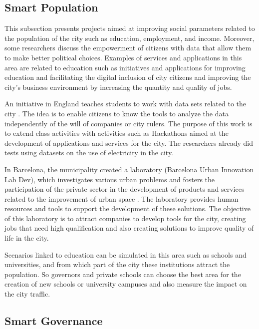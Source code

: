 \subsection{Smart Population}

This subsection presents projects aimed at improving social parameters related to the population of the city such as education, employment, and income. Moreover, some researchers discuss the empowerment of citizens with data that allow them to make better political choices. Examples of services and applications in this area are related to education such as initiatives and applications for improving education and facilitating the digital inclusion of city citizens and improving the city's business environment by increasing the quantity and quality of jobs.

An initiative in England teaches students to work with data sets related to the city \cite {wolff2015education}. The idea is to enable citizens to know the tools to analyze the data independently of the will of companies or city rulers. The purpose of this work is to extend class activities with activities such as Hackathons aimed at the development of applications and services for the city. The researchers already did tests using datasets on the use of electricity in the city.

In Barcelona, the municipality created a laboratory (Barcelona Urban Innovation Lab Dev), which investigates various urban problems and fosters the participation of the private sector in the development of products and services related to the improvement of urban space \cite {bakici2013smart}. The laboratory provides human resources and tools to support the development of these solutions. The objective of this laboratory is to attract companies to develop tools for the city, creating jobs that need high qualification and also creating solutions to improve quality of life in the city.

Scenarios linked to education can be simulated in this area such as schools and universities, and from which part of the city these institutions attract the population. So governors and private schools can choose the best area for the creation of new schools or university campuses and also measure the impact on the city traffic.

\subsection{Smart Governance}
\label{subsec:governanca}

